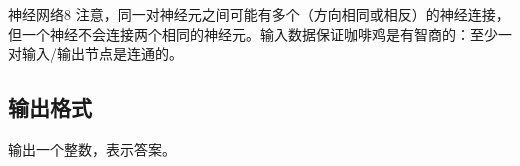 \begin{Problem}{神经网络}{8}
注意，同一对神经元之间可能有多个（方向相同或相反）的神经连接，但一个神经不会连接两个相同的神经元。输入数据保证咖啡鸡是有智商的：至少一对输入/输出节点是连通的。

\subsection*{输出格式}

输出一个整数，表示答案。

\setcounter{ExampleNo}{0}


\end{Problem}
